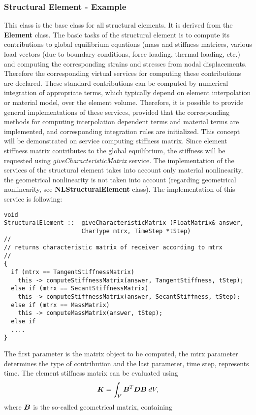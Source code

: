 \documentclass[12pt,draft]{article}
\newcommand{\class}[1]{{\bf #1}}
\newcommand{\service}[1]{{\em #1}}
\newcommand{\mbf}[1]{\mbox{\boldmath$#1$}}
\begin{document}
\subsubsection{Structural Element -  Example}
This class is the base class for all structural elements.
It is derived from the \class{Element} class. 
The basic tasks of the structural element is to compute its contributions
to global equilibrium equations (mass and stiffness matrices, various
load vectors (due to boundary conditions, force loading, thermal
loading, etc.) and computing the corresponding strains and stresses
from nodal displacements. Therefore the corresponding virtual services
for computing these contributions are declared.
These standard contributions can be computed by numerical
integration  of appropriate terms, which typically depend on 
element interpolation or material model, over the element volume. Therefore, it is possible to
provide general implementations of these services, provided that the
corresponding methods for computing interpolation dependent terms and
material terms are implemented, and corresponding integration rules
are initialized. 
This concept will be demonstrated on service computing stiffness
matrix. Since element stiffness matrix contributes to the global
equilibrium, the stiffness will be requested using
\service{giveCharacteristicMatrix} service. 
The implementation of the services of the structural element takes
into account only material nonlinearity, the geometrical nonlinearity 
is not taken into account (regarding geometrical nonlinearity, see \class{NLStructuralElement} class).
The implementation of this
service is following:
\begin{verbatim}
void
StructuralElement ::  giveCharacteristicMatrix (FloatMatrix& answer, 
                      CharType mtrx, TimeStep *tStep) 
// 
// returns characteristic matrix of receiver according to mtrx
//
{
  if (mtrx == TangentStiffnessMatrix) 
    this -> computeStiffnessMatrix(answer, TangentStiffness, tStep);
  else if (mtrx == SecantStiffnessMatrix) 
    this -> computeStiffnessMatrix(answer, SecantStiffness, tStep);
  else if (mtrx == MassMatrix) 
    this -> computeMassMatrix(answer, tStep);
  else if 
  ....
}
\end{verbatim}
The first parameter is the matrix object to be computed, the mtrx
parameter determines the type of contribution and the last parameter, time step, represents time.
The element stiffness matrix can be evaluated using
$$
\mbf{K} = \int_{V} \mbf{B}^T\mbf{D}\mbf{B}\;dV,
$$
where $\mbf{B}$ is the so-called geometrical matrix, containing
\end{document}
